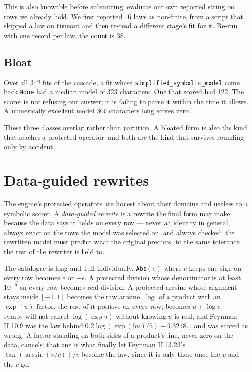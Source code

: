 \documentclass[11pt,a4paper]{article}
\begin{document}
This is also knowable before submitting: evaluate our own reported string on
rows we already hold. We first reported 16 laws as non-finite, from a script
that skipped a law on timeout and then re-read a different stage's fit for it.
Re-run with one record per law, the count is 38.

\subsection{Bloat}

Over all 342 fits of the cascade, a fit whose \texttt{simplified\_symbolic\_model}
came back \texttt{None} had a median model of 323 characters. One that scored had
122. The scorer is not refusing our answer; it is failing to parse it within the
time it allows. A numerically excellent model 300 characters long scores zero.

These three classes overlap rather than partition. A bloated form is also the
kind that reaches a protected operator, and both are the kind that survives
rounding only by accident.

\section{Data-guided rewrites}
\label{sec:rewrites}

The engine's protected operators are honest about their domains and useless to a
symbolic scorer. A \emph{data-guided rewrite} is a rewrite the final form may
make because the data says it holds on every row --- never an identity in
general, always exact on the rows the model was selected on, and always checked:
the rewritten model must predict what the original predicts, to the same
tolerance the rest of the rewriter is held to.

The catalogue is long and dull individually. \texttt{Abs}$(e)$ where $e$ keeps
one sign on every row becomes $e$ or $-e$. A protected division whose denominator
is at least $10^{-6}$ on every row becomes real division. A protected arcsine
whose argument stays inside $[-1,1]$ becomes the raw arcsine. $\log$ of a product
with an $\exp(u)$ factor, the rest of it positive on every row, becomes $u + \log
c$ --- sympy will not cancel $\log(\exp u)$ without knowing $u$ is real, and
Feynman II.10.9 was the law behind $0.2\log(\exp(5u)/5) + 0.3218\ldots$ and was
scored as wrong. A factor standing on both sides of a product's line, never zero
on the data, cancels; that one is what finally let Feynman II.13.23's
$\tan(\arcsin(v/c))/v$ become the law, since it is only there once the $v$ and
the $c$ go.
\end{document}
